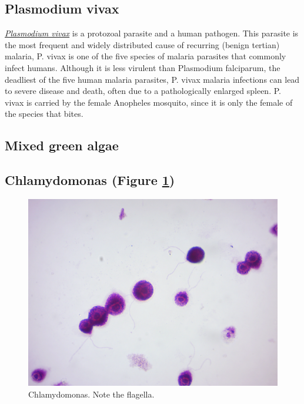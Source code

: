 \subsection{Plasmodium vivax}\label{plasmodium-vivax}

\href{https://en.wikipedia.org/wiki/Plasmodium_vivax}{\emph{Plasmodium
vivax}} is a protozoal parasite and a human pathogen. This parasite is
the most frequent and widely distributed cause of recurring (benign
tertian) malaria, P. vivax is one of the five species of malaria
parasites that commonly infect humans. Although it is less virulent than
Plasmodium falciparum, the deadliest of the five human malaria
parasites, P. vivax malaria infections can lead to severe disease and
death, often due to a pathologically enlarged spleen. P. vivax is
carried by the female Anopheles mosquito, since it is only the female of
the species that bites.

\subsection{Mixed green algae}\label{mixed-green-algae}

\subsection{Chlamydomonas (Figure
\ref{fig:chlamydomonas})}\label{chlamydomonas-figure-reffigchlamydomonas}

\begin{figure}

{\centering \includegraphics[width=0.7\linewidth]{./figures/protists/chlamydomonas}

}

\caption{Chlamydomonas. Note the flagella.}\label{fig:chlamydomonas}
\end{figure}

